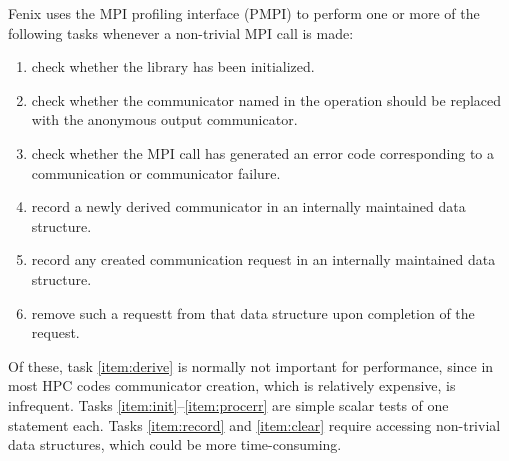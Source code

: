 Fenix uses the MPI profiling interface (PMPI) to
perform one or more of the following tasks whenever a non-trivial MPI call is made:
\begin{enumerate}
\item check whether the library has been initialized.\label{item:init}
\item check whether the communicator named in the operation should be replaced with
  the anonymous output communicator.\label{item:anon}
\item check whether the MPI call has generated an error code corresponding to a
  communication or communicator failure.\label{item:procerr}
\item record a newly derived communicator in an internally maintained data structure.\label{item:derive}
\item record any created communication request in an internally maintained data structure.\label{item:record}
\item remove such a requestt from that data structure upon completion of the request.\label{item:clear}
\end{enumerate}
Of these, task \ref{item:derive} is normally not important for performance, since
in most HPC codes communicator creation, which is relatively expensive, is infrequent.
Tasks \ref{item:init}--\ref{item:procerr} are simple scalar tests of one statement each.
Tasks \ref{item:record} and \ref{item:clear} require accessing non-trivial data structures,
which could be more time-consuming.


